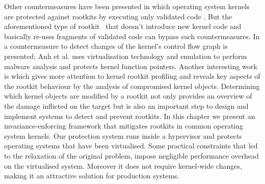 Other countermeasures have been presented in which operating system kernels are protected against rootkits by executing only validated code \cite{SecVisor,NICKLE,5}. But the aforementioned type of rootkit~\cite{Hund2009} that doesn't introduce new kernel code and basically re-uses fragments of validated code can bypass such countermeasures.
In \cite{4} a countermeasure to detect changes of the kernel's control flow graph is presented; Anh et al. \cite{MAVMM} uses virtualisation technology and emulation to perform malware analysis and \cite{HookSafe} protects kernel function pointers. Another interesting work is \cite{PoKer} which gives more attention to kernel rootkit profiling and reveals key aspects of the rootkit behaviour by the analysis of compromised kernel objects. 
Determining which kernel objects are modified by a rootkit not only provides an overview of the damage inflicted on the target but is also an important step to design and implement systems to detect and prevent rootkits.
In this chapter we present an invariance-enforcing framework that mitigates rootkits in common operating system kernels. 
Our protection system runs inside a hypervisor and protects operating systems that have been virtualised. 
Some practical constraints that led to the relaxation of the original problem, impose negligible performance overhead on the virtualised system.
Moreover it does not require kernel-wide changes, making it an attractive solution for production systems.
